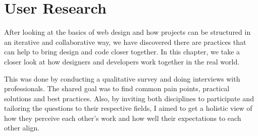 \newpage
\section{User Research}
After looking at the basics of web design and how projects can be structured in an iterative and
collaborative way, we have discovered there are practices that can help to bring design and code
closer together. In this chapter, we take a closer look at how designers and developers work
together in the real world. 

This was done by conducting a qualitative survey and doing interviews with professionals. The shared
goal was to find common pain points, practical solutions and best practices. Also, by inviting both
disciplines to participate and tailoring the questions to their respective fields, I aimed to get a
holistic view of how they perceive each other's work and how well their expectations to each other
align.




